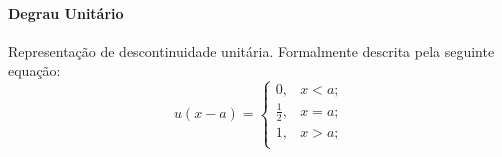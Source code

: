 \documentclass{article}
\begin{document}
\begin{multicols}{2}
                    \paragraph{Degrau Unitário}Representação de descontinuidade unitária. Formalmente descrita pela seguinte equação:
                        \begin{equation}
                            \boxed{
                                u(x - a) = 
                                \begin{cases}
                                    0, & x < a;\\
                                    \frac{1}{2}, & x = a;\\
                                    1, & x > a;\\
                                \end{cases}
                            }
                        \end{equation}
                \end{multicols}
\end{document}
